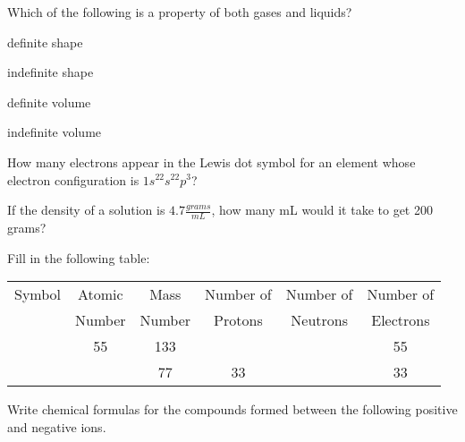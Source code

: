 \documentclass[addpoints, 12pt]{exam}
\begin{document}
\begin{questions}
\question[4] Which of the following is a property of both gases and
liquids?
\begin{choices}
  \choice definite shape
 
 \choice indefinite shape

 \choice definite volume

 \choice indefinite volume
\end{choices}

\question[4] How many electrons appear in the Lewis dot symbol for an
element whose electron configuration is $1s^22s^22p^3$?

\begin{choices}




\end{choices}


\question[5]
If the density of a solution is $4.7 \frac{grams}{mL}$, how many mL would it take to get 200 grams?
\vspace{1cm}

\question[10]
Fill in the following table:

\begin{tabular}{| c | c | c | c | c | c |}
\hline
Symbol & Atomic & Mass & Number of&Number of&Number of \\
 & Number & Number & Protons & Neutrons & Electrons \\
\hline
 & 55 & 133 & & & 55\\
\hline
& & 77 & 33 & & 33\\ 
\hline
\end{tabular}
\vspace{1cm}

\question[10]  Write chemical formulas for the compounds formed between the following positive and negative ions.
\vspace{1cm}


\end{questions}
\end{document}
